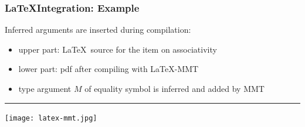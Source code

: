\documentclass{beamer}
\begin{document}
\begin{frame}\frametitle{\LaTeX Integration: Example}
Inferred arguments are inserted during compilation:
\begin{itemize}
\item upper part: \LaTeX\ source for the item on associativity
\item lower part: pdf after compiling with \LaTeX-MMT
\item type argument $M$ of equality symbol is inferred and added by MMT
\end{itemize}
\medskip

\hrule\medskip

\texttt{[image: latex-mmt.jpg]}
\thispagestyle{empty}
\end{frame}

\end{document}
